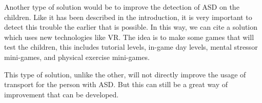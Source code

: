 Another type of solution would be to improve the detection of ASD on the children. Like it has been described in the introduction, it is very important to detect this trouble the earlier that is possible. In this way, we can cite a solution which uses new technologies like VR. The idea is to make some games that will test the children, this includes tutorial levels, in-game day levels, mental stressor mini-games, and physical exercise mini-games\cite{2021DesigningSmartVirtual}.

This type of solution, unlike the other, will not directly improve the usage of transport for the person with ASD. But this can still be a great way of improvement that can be developed.
